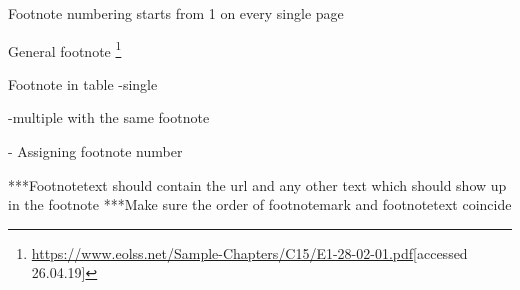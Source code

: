 Footnote numbering starts from 1 on every single page

General footnote 
\footnote{\url{https://www.eolss.net/Sample-Chapters/C15/E1-28-02-01.pdf}[accessed 26.04.19]}



Footnote in table
-single 
\footnotemark
\footnotetext{}

-multiple with the same footnote
\footnotemark
\footnotemark[\value{footnote}]

- Assigning footnote number
\footnotemark[***value***]

***Footnotetext should contain the url and any other text which should show up in the footnote
***Make sure the order of footnotemark and footnotetext coincide
